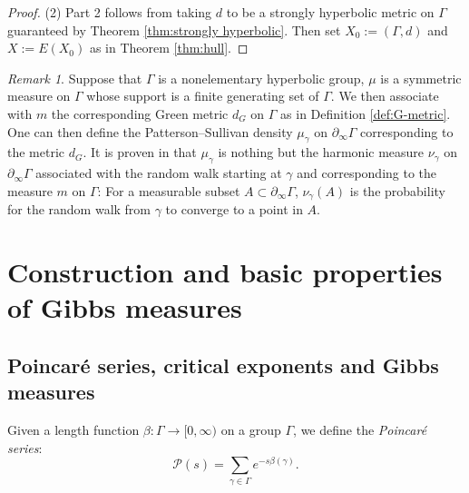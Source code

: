 \documentclass[12pt]{amsbook}%
\theoremstyle{definition}
\theoremstyle{remark}
\newtheorem{rem}[thm]{Remark}
\numberwithin{section}{chapter}
\numberwithin{subsection}{section}
\numberwithin{figure}{chapter}
\def\cP{{\mathscr{P}}}
\def\Ga{\Gamma}
\def\ga{\gamma}
\def\geo{\partial_\infty}
\def\kap{}
\begin{document}
{{\begin{proof}
\medskip 
(2) Part 2 follows from taking $d$ to be a strongly hyperbolic metric on $\Ga$ guaranteed by Theorem \ref{thm:strongly hyperbolic}. 
Then set $X_0:=(\Ga, d)$ and $X:=E(X_0)$ as in Theorem \ref{thm:hull}.  
 \end{proof}


\begin{rem}
{\kap Suppose that $\Ga$ is a nonelementary hyperbolic group, $\mu$ is a symmetric measure on $\Ga$ whose support is a finite generating set of $\Ga$. 
We then associate with $m$ the corresponding Green metric $d_G$ on $\Ga$ as in Definition \ref{def:G-metric}. One can then define the Patterson--Sullivan density 
$\mu_\ga$ on $\geo \Ga$ corresponding to the metric $d_G$. It is proven in \cite{BHM} that $\mu_\ga$ is nothing but the harmonic measure $\nu_\ga$ on $\geo \Ga$ associated with the random walk starting at $\ga$ and corresponding to the measure $m$ on $\Ga$: For a measurable subset $A\subset \geo \Ga$, $\nu_\ga(A)$ is the probability for the random walk from $\ga$ to converge to a point in $A$. } %
 \end{rem}




\section{Construction and basic properties of Gibbs measures} \label{section_Gibbs}

 
\subsection{Poincar\'e series, critical exponents and Gibbs measures}\label{sec:Gibbs}


Given a length function $\beta: \Ga\to [0,\infty)$ on a group $\Ga$, we define the {\em Poincar\'e series}: \index{Poincar\'e series $\cP(s)$}
\begin{equation}
\cP(s) = \sum_{\gamma \in \Gamma} e^{-s \beta(\gamma)}.
\end{equation}

}}
\end{document}
